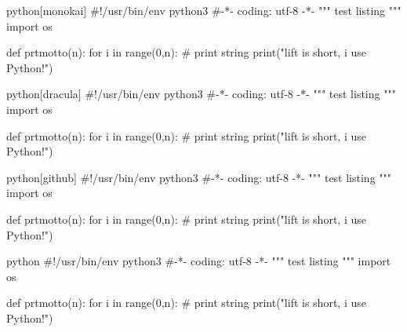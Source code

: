 \documentclass[utf8,a4paper,11pt]{article}
\begin{document}
\newpage

\begin{sourcecode}[monokai]{python}[monokai]
#!/usr/bin/env python3
#-*- coding: utf-8 -*-
"""
test listing
"""
import os

def prtmotto(n):
    for i in range(0,n):
        # print string
        print("lift is short, i use Python!")
\end{sourcecode}

\vspace{6em}

\begin{sourcecode}[dracula]{python}[dracula]
#!/usr/bin/env python3
#-*- coding: utf-8 -*-
"""
test listing
"""
import os

def prtmotto(n):
    for i in range(0,n):
        # print string
        print("lift is short, i use Python!")
\end{sourcecode}

\newpage

\begin{sourcecode}[github]{python}[github]
#!/usr/bin/env python3
#-*- coding: utf-8 -*-
"""
test listing
"""
import os

def prtmotto(n):
    for i in range(0,n):
        # print string
        print("lift is short, i use Python!")
\end{sourcecode}

\vspace{6em}

\begin{sourcecode}[default]{python}
#!/usr/bin/env python3
#-*- coding: utf-8 -*-
"""
test listing
"""
import os

def prtmotto(n):
    for i in range(0,n):
        # print string
        print("lift is short, i use Python!")
\end{sourcecode}
\end{document}
